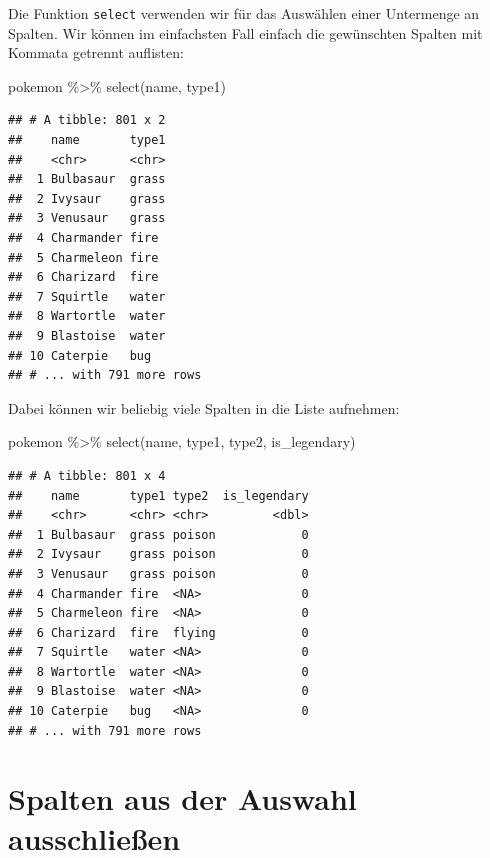 \documentclass[
]{book}
\newenvironment{Shaded}{\begin{snugshade}}{\end{snugshade}}
\newcommand{\FunctionTok}[1]{\textcolor[rgb]{0.00,0.00,0.00}{#1}}
\newcommand{\NormalTok}[1]{#1}
\newcommand{\SpecialCharTok}[1]{\textcolor[rgb]{0.00,0.00,0.00}{#1}}
\begin{document}
Die Funktion \texttt{select} verwenden wir für das Auswählen einer Untermenge an Spalten. Wir können im einfachsten Fall einfach die gewünschten Spalten mit Kommata getrennt auflisten:

\begin{Shaded}
\begin{Highlighting}[]
\NormalTok{pokemon }\SpecialCharTok{\%\textgreater{}\%}
  \FunctionTok{select}\NormalTok{(name, type1)}
\end{Highlighting}
\end{Shaded}

\begin{verbatim}
## # A tibble: 801 x 2
##    name       type1
##    <chr>      <chr>
##  1 Bulbasaur  grass
##  2 Ivysaur    grass
##  3 Venusaur   grass
##  4 Charmander fire 
##  5 Charmeleon fire 
##  6 Charizard  fire 
##  7 Squirtle   water
##  8 Wartortle  water
##  9 Blastoise  water
## 10 Caterpie   bug  
## # ... with 791 more rows
\end{verbatim}

Dabei können wir beliebig viele Spalten in die Liste aufnehmen:

\begin{Shaded}
\begin{Highlighting}[]
\NormalTok{pokemon }\SpecialCharTok{\%\textgreater{}\%}
  \FunctionTok{select}\NormalTok{(name, type1, type2, is\_legendary)}
\end{Highlighting}
\end{Shaded}

\begin{verbatim}
## # A tibble: 801 x 4
##    name       type1 type2  is_legendary
##    <chr>      <chr> <chr>         <dbl>
##  1 Bulbasaur  grass poison            0
##  2 Ivysaur    grass poison            0
##  3 Venusaur   grass poison            0
##  4 Charmander fire  <NA>              0
##  5 Charmeleon fire  <NA>              0
##  6 Charizard  fire  flying            0
##  7 Squirtle   water <NA>              0
##  8 Wartortle  water <NA>              0
##  9 Blastoise  water <NA>              0
## 10 Caterpie   bug   <NA>              0
## # ... with 791 more rows
\end{verbatim}

\hypertarget{spalten-aus-der-auswahl-ausschlieuxdfen}{%
\section{Spalten aus der Auswahl ausschließen}\label{spalten-aus-der-auswahl-ausschlieuxdfen}}
\end{document}
